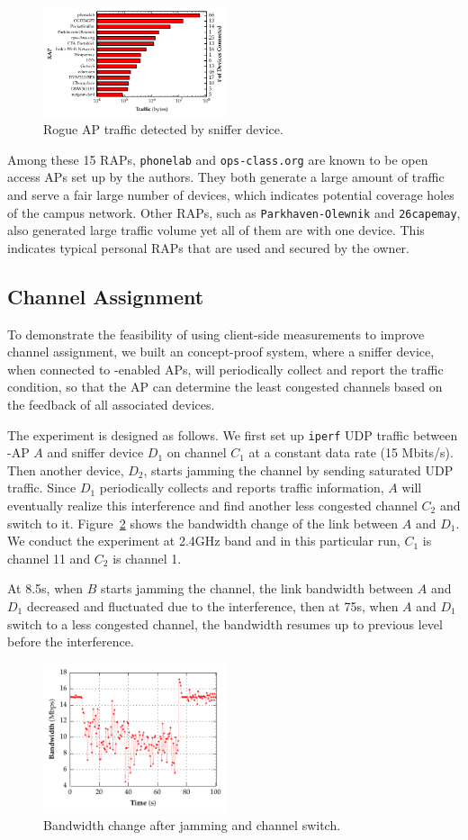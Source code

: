 \begin{figure}[t!]
  \centering
  \includegraphics[width=0.48\textwidth]{./figures/RAPTrafficGraph.pdf}
  \caption{Rogue AP traffic detected by sniffer device.}
  \label{fig:rap}
\end{figure}

Among these 15 RAPs, \texttt{phonelab} and \texttt{ops-class.org} are known to
be open access APs set up by the authors.  They both generate a large amount of
traffic and serve a fair large number of devices, which indicates potential
coverage holes of the campus network. Other RAPs, such as
\texttt{Parkhaven-Olewnik} and \texttt{26capemay}, also generated large traffic
volume yet all of them are with one device. This indicates typical personal RAPs
that are used and secured by the owner.


\subsection{Channel Assignment}

To demonstrate the feasibility of using client-side measurements to improve
channel assignment, we built an concept-proof system, where a sniffer device,
when connected to \PS{}-enabled APs, will periodically collect
and report the traffic condition, so that the AP can determine the least
congested channels based on the feedback of all associated devices. 

The experiment is designed as follows. We first set up \texttt{iperf} UDP
traffic between \PS{}-AP $A$ and sniffer device $D_1$ on channel $C_1$ at a
constant data rate (15 Mbits/s). Then another device, $D_2$, starts jamming the
channel by sending saturated UDP traffic. Since $D_1$ periodically collects and
reports traffic information, $A$ will eventually realize this interference and
find another less congested channel $C_2$ and switch to it. Figure~\ref{fig:bw}
shows the bandwidth change of the link between $A$ and $D_1$. We conduct the
experiment at 2.4GHz band and in this particular run, $C_1$ is channel 11 and $C_2$
is channel 1.

At 8.5s, when $B$ starts jamming the channel, the link bandwidth between $A$ and
$D_1$ decreased and fluctuated due to the interference, then at 75s, when $A$
and $D_1$ switch to a less congested channel, the bandwidth resumes up to
previous level before the interference.

\begin{figure}[t!]
  \centering
  \includegraphics[width=0.48\textwidth]{./figures/ChannelBWGraph.pdf}
  \caption{Bandwidth change after jamming and channel switch.}
  \label{fig:bw}
\end{figure}
